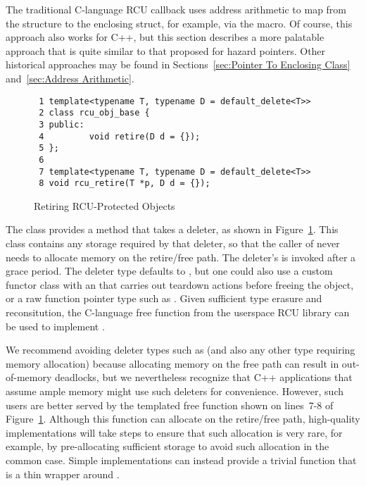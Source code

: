 \documentclass[letterpaper,10pt]{article}
\begin{document}
The traditional C-language RCU callback uses address arithmetic
to map from the  structure to the enclosing struct,
for example, via the  macro.
Of course, this approach also works for C++, but this section describes
a more palatable approach that is quite similar to that proposed for
hazard pointers.
Other historical approaches may be found in
Sections~\ref{sec:Pointer To Enclosing Class}
and~\ref{sec:Address Arithmetic}.

\begin{figure}[tbp]
{ \scriptsize
\begin{verbatim}
 1 template<typename T, typename D = default_delete<T>>
 2 class rcu_obj_base {
 3 public:
 4         void retire(D d = {});
 5 };
 6
 7 template<typename T, typename D = default_delete<T>>
 8 void rcu_retire(T *p, D d = {});
\end{verbatim}
}
\caption{Retiring RCU-Protected Objects}
\label{fig:Retiring RCU-Protected Objects}
\end{figure}

The  class provides a  method that
takes a deleter,
as shown in
Figure~\ref{fig:Retiring RCU-Protected Objects}.
This class contains any storage required by that deleter, so that
the caller of
 never needs to allocate
memory on the retire/free path.
The deleter's  is invoked after a grace period.
The deleter type defaults to ,
but one could also use a
custom functor class with an  that carries out teardown actions
before freeing the object, or a raw function pointer type such as
.
Given sufficient type erasure and reconsitution, the 
C-language free function from the userspace RCU library can be used to
implement .

We recommend avoiding deleter types such as 
(and also any other type requiring memory allocation) because
allocating memory on the free path can result in out-of-memory deadlocks,
but we nevertheless recognize that C++ applications that assume ample
memory might use such deleters for convenience.
However, such users are better served by the 
templated free function shown on lines~7-8 of
Figure~\ref{fig:Retiring RCU-Protected Objects}.
Although this function can allocate on the retire/free path, high-quality
implementations will take steps to ensure that such allocation is very
rare, for example, by pre-allocating sufficient storage to avoid
such allocation in the common case.
Simple implementations can instead provide a trivial 
function that is a thin wrapper around .
\end{document}
